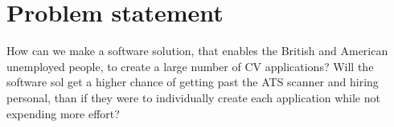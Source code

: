 \section{Problem statement}\label{sec:problem}
How can we make a software solution, that enables the British and American unemployed people, 
to create a large number of CV applications?
Will the software sol get a higher chance of getting past the ATS scanner and hiring personal, than
if they were to individually create each application while not expending more effort? 